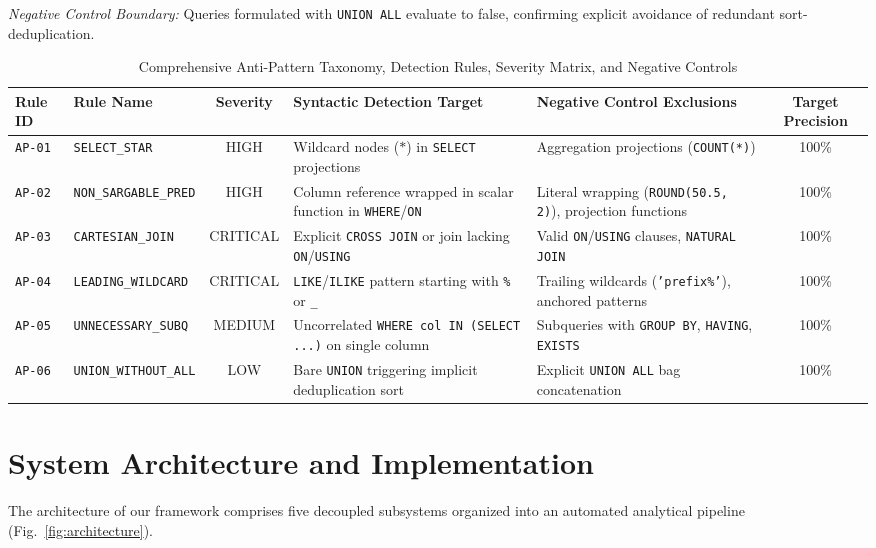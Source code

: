 \documentclass[conference]{IEEEtran}
\begin{document}
\textit{Negative Control Boundary:} Queries formulated with \texttt{UNION ALL} evaluate to false, confirming explicit avoidance of redundant sort-deduplication.

\begin{table}[t]
\caption{Comprehensive Anti-Pattern Taxonomy, Detection Rules, Severity Matrix, and Negative Controls}
\label{tab:rules_taxonomy}
\centering
\begin{tabular}{lp{3.2cm}cp{4.2cm}p{4.2cm}c}
\toprule
\textbf{Rule ID} & \textbf{Rule Name} & \textbf{Severity} & \textbf{Syntactic Detection Target} & \textbf{Negative Control Exclusions} & \textbf{Target Precision} \\
\midrule
\texttt{AP-01} & \texttt{SELECT\_STAR} & HIGH & Wildcard nodes ($*$) in \texttt{SELECT} projections & Aggregation projections (\texttt{COUNT(*)}) & 100\% \\
\texttt{AP-02} & \texttt{NON\_SARGABLE\_PRED} & HIGH & Column reference wrapped in scalar function in \texttt{WHERE}/\texttt{ON} & Literal wrapping (\texttt{ROUND(50.5, 2)}), projection functions & 100\% \\
\texttt{AP-03} & \texttt{CARTESIAN\_JOIN} & CRITICAL & Explicit \texttt{CROSS JOIN} or join lacking \texttt{ON}/\texttt{USING} & Valid \texttt{ON}/\texttt{USING} clauses, \texttt{NATURAL JOIN} & 100\% \\
\texttt{AP-04} & \texttt{LEADING\_WILDCARD} & CRITICAL & \texttt{LIKE}/\texttt{ILIKE} pattern starting with \texttt{\%} or \texttt{\_} & Trailing wildcards (\texttt{'prefix\%'}), anchored patterns & 100\% \\
\texttt{AP-05} & \texttt{UNNECESSARY\_SUBQ} & MEDIUM & Uncorrelated \texttt{WHERE col IN (SELECT ...)} on single column & Subqueries with \texttt{GROUP BY}, \texttt{HAVING}, \texttt{EXISTS} & 100\% \\
\texttt{AP-06} & \texttt{UNION\_WITHOUT\_ALL} & LOW & Bare \texttt{UNION} triggering implicit deduplication sort & Explicit \texttt{UNION ALL} bag concatenation & 100\% \\
\bottomrule
\end{tabular}
\end{table}

\section{System Architecture and Implementation}

The architecture of our framework comprises five decoupled subsystems organized into an automated analytical pipeline (Fig.~\ref{fig:architecture}).
\end{document}
